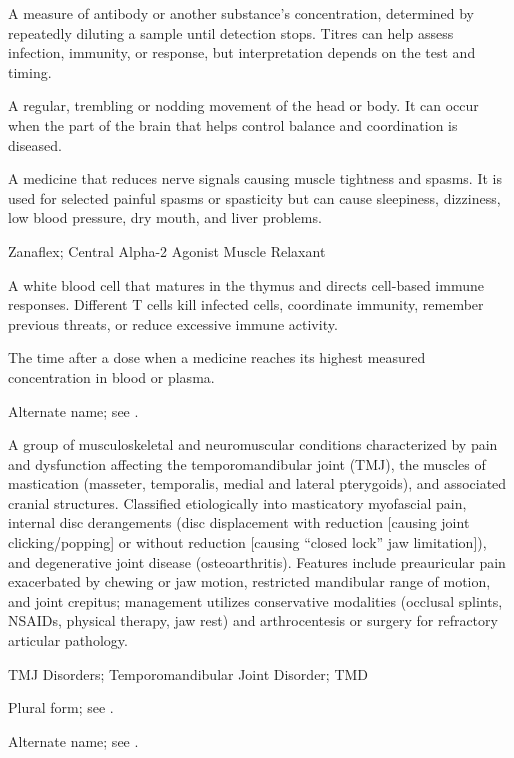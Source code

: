  A measure of antibody or another substance's concentration, determined by repeatedly diluting a sample until detection stops. Titres can help assess infection, immunity, or response, but interpretation depends on the test and timing.

 A regular, trembling or nodding movement of the head or body. It can occur when the part of the brain that helps control balance and coordination is diseased.

 A medicine that reduces nerve signals causing muscle tightness and spasms. It is used for selected painful spasms or spasticity but can cause sleepiness, dizziness, low blood pressure, dry mouth, and liver problems.

\synonyms
Zanaflex; Central Alpha-2 Agonist Muscle Relaxant

 A white blood cell that matures in the thymus and directs cell-based immune responses. Different T cells kill infected cells, coordinate immunity, remember previous threats, or reduce excessive immune activity.

 The time after a dose when a medicine reaches its highest measured concentration in blood or plasma.

 Alternate name; see .

 A group of musculoskeletal and neuromuscular conditions characterized by pain and dysfunction affecting the temporomandibular joint (TMJ), the muscles of mastication (masseter, temporalis, medial and lateral pterygoids), and associated cranial structures. Classified etiologically into masticatory myofascial pain, internal disc derangements (disc displacement with reduction [causing joint clicking/popping] or without reduction [causing ``closed lock'' jaw limitation]), and degenerative joint disease (osteoarthritis). Features include preauricular pain exacerbated by chewing or jaw motion, restricted mandibular range of motion, and joint crepitus; management utilizes conservative modalities (occlusal splints, NSAIDs, physical therapy, jaw rest) and arthrocentesis or surgery for refractory articular pathology.

\synonyms
TMJ Disorders; Temporomandibular Joint Disorder; TMD

 Plural form; see .

 Alternate name; see .

